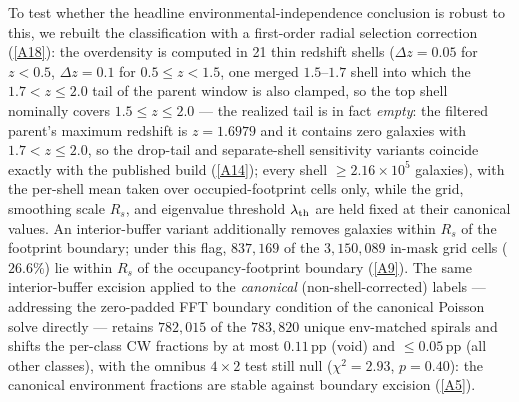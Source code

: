 \documentclass[aps,prd,twocolumn,superscriptaddress,showpacs,preprintnumbers,nofootinbib,longbibliography,floatfix]{revtex4-2}
\newcommand{\repoBase}{https://github.com/Hubify-Projects/bigbounce/blob/main}
\begin{document}
To test whether the headline environmental-independence conclusion is
robust to this, we rebuilt the classification with a first-order radial
selection correction
(\href{\repoBase/pipelines/p5\_desi\_chirality/scripts/16\_cosmic\_web\_zshell\_corrected.py}{[A18]}): the
overdensity is computed in 21 thin redshift shells ($\Delta z = 0.05$
for $z<0.5$, $\Delta z = 0.1$ for $0.5 \le z < 1.5$, one merged
$1.5$--$1.7$ shell into which the $1.7 < z \le 2.0$ tail of
the parent window is also clamped, so the top shell nominally
covers $1.5 \le z \le 2.0$ --- the realized tail is in fact
\emph{empty}: the filtered parent's maximum redshift is
$z = 1.6979$ and it contains zero galaxies with $1.7 < z \le 2.0$,
so the drop-tail and separate-shell sensitivity variants coincide
exactly with the published build
(\href{\repoBase/pipelines/p5\_desi\_chirality/outputs/24\_r24conf\_pod\_session.json}{[A14]});
every shell $\ge 2.16\times10^5$
galaxies), with the
per-shell mean taken over occupied-footprint cells only, while the
grid, smoothing scale $R_s$, and eigenvalue threshold
$\lambda_{\rm th}$ are held fixed at their canonical values. An
interior-buffer variant additionally removes galaxies within $R_s$ of
the footprint boundary; under this flag, $837{,}169$ of the
$3{,}150{,}089$ in-mask grid cells ($26.6\%$) lie within $R_s$ of the
occupancy-footprint boundary
(\href{\repoBase/pipelines/p5\_desi\_chirality/outputs/22\_r24conf\_local\_batch.json}{[A9]}). The same interior-buffer excision applied to
the \emph{canonical} (non-shell-corrected) labels — addressing the
zero-padded FFT boundary condition of the canonical Poisson solve
directly — retains $782{,}015$ of the $783{,}820$ unique env-matched
spirals and shifts the per-class CW fractions by at most $0.11$\,pp
(void) and $\le 0.05$\,pp (all other classes), with the omnibus
$4\times2$ test still null ($\chi^2 = 2.93$, $p = 0.40$): the
canonical environment fractions are stable against boundary
excision
(\href{\repoBase/pipelines/p5\_desi\_chirality/outputs/21\_r23conf\_meta\_closures.json}{[A5]}).
\end{document}
